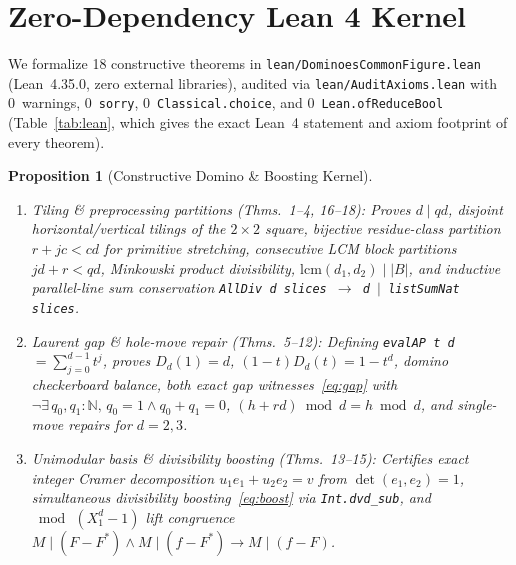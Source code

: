 \documentclass[11pt,twocolumn]{article}
\newtheorem{proposition}{Proposition}
\newcommand{\NN}{\mathbb{N}}
\begin{document}
\section{Zero-Dependency Lean 4 Kernel}\label{sec:lean}
We formalize 18 constructive theorems in \texttt{lean/DominoesCommonFigure.lean} (Lean~4.35.0, zero external libraries), audited via \texttt{lean/AuditAxioms.lean} with 0~warnings, 0~\texttt{sorry}, 0~\texttt{Classical.choice}, and 0~\texttt{Lean.ofReduceBool} (Table~\ref{tab:lean}, which gives the exact Lean~4 statement and axiom footprint of every theorem).

\begin{proposition}[Constructive Domino \& Boosting Kernel]\label{prop:lean}
\leavevmode
\begin{enumerate}[leftmargin=*,nosep]
  \item \emph{Tiling \& preprocessing partitions (Thms.~1--4, 16--18):} Proves $d \mid qd$, disjoint horizontal/vertical tilings of the $2{\times}2$ square, bijective residue-class partition $r + jc < cd$ for primitive stretching, consecutive LCM block partitions $jd + r < qd$, Minkowski product divisibility, $\mathrm{lcm}(d_1,d_2) \mid |B|$, and inductive parallel-line sum conservation \texttt{AllDiv d slices $\to$ d $\mid$ listSumNat slices}.
  \item \emph{Laurent gap \& hole-move repair (Thms.~5--12):} Defining \texttt{evalAP t d} $= \sum_{j=0}^{d-1} t^j$, proves $D_d(1) = d$, $(1-t)D_d(t) = 1-t^d$, domino checkerboard balance, both exact gap witnesses~\eqref{eq:gap} with $\neg\exists\, q_0,q_1:\NN,\, q_0=1 \land q_0+q_1=0$, $(h + rd) \bmod d = h \bmod d$, and single-move repairs for $d=2, 3$.
  \item \emph{Unimodular basis \& divisibility boosting (Thms.~13--15):} Certifies exact integer Cramer decomposition $u_1 e_1 + u_2 e_2 = v$ from $\det(e_1, e_2)=1$, simultaneous divisibility boosting~\eqref{eq:boost} via \texttt{Int.dvd\_sub}, and $\bmod\,(X_1^d - 1)$ lift congruence $M\mid(F-F^*) \land M\mid(f-F^*) \to M\mid(f-F)$.
\end{enumerate}
\end{proposition}
\end{document}
